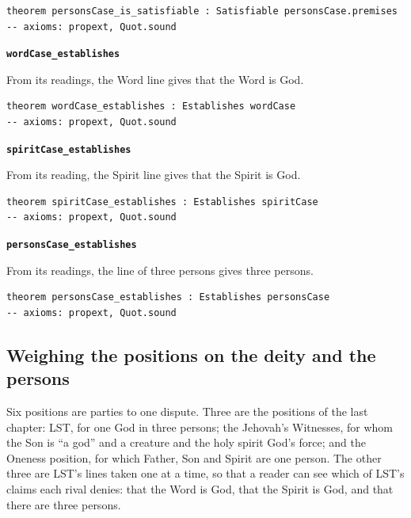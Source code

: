 \documentclass[11pt,paper=\testimonypaper,DIV=13,parskip=false]{scrartcl}
\begin{document}
{\small\begin{verbatim}
theorem personsCase_is_satisfiable : Satisfiable personsCase.premises
-- axioms: propext, Quot.sound
\end{verbatim}}
\par\medskip\noindent\textbf{\texttt{word\allowbreak{}Case\_\allowbreak{}establishes}}\par\nobreak\noindent
From its readings, the Word line gives that the Word is God.

{\small\begin{verbatim}
theorem wordCase_establishes : Establishes wordCase
-- axioms: propext, Quot.sound
\end{verbatim}}
\par\medskip\noindent\textbf{\texttt{spirit\allowbreak{}Case\_\allowbreak{}establishes}}\par\nobreak\noindent
From its reading, the Spirit line gives that the Spirit is God.

{\small\begin{verbatim}
theorem spiritCase_establishes : Establishes spiritCase
-- axioms: propext, Quot.sound
\end{verbatim}}
\par\medskip\noindent\textbf{\texttt{persons\allowbreak{}Case\_\allowbreak{}establishes}}\par\nobreak\noindent
From its readings, the line of three persons gives three persons.

{\small\begin{verbatim}
theorem personsCase_establishes : Establishes personsCase
-- axioms: propext, Quot.sound
\end{verbatim}}
\subsection*{Weighing the positions on the deity and the persons}
Six positions are parties to one dispute. Three are the positions of the last chapter: LST, for one God in three persons; the Jehovah’s Witnesses, for whom the Son is “a god” and a creature and the holy spirit God’s force; and the Oneness position, for which Father, Son and Spirit are one person. The other three are LST’s lines taken one at a time, so that a reader can see which of LST’s claims each rival denies: that the Word is God, that the Spirit is God, and that there are three persons.
\end{document}
